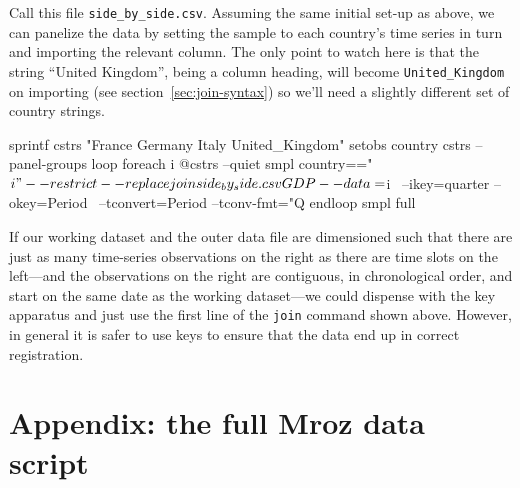 Call this file \verb|side_by_side.csv|.  Assuming the same initial
set-up as above, we can panelize the data by setting the sample to
each country's time series in turn and importing the relevant
column. The only point to watch here is that the string ``United
Kingdom'', being a column heading, will become \verb|United_Kingdom|
on importing (see section~\ref{sec:join-syntax}) so we'll need a
slightly different set of country strings.
%
\begin{code}
sprintf cstrs "France Germany Italy United_Kingdom"
setobs country cstrs --panel-groups
loop foreach i @cstrs --quiet
  smpl country=="$i" --restrict --replace
  join side_by_side.csv GDP --data=$i \
  --ikey=quarter --okey=Period \
  --tconvert=Period --tconv-fmt="Q%
endloop
smpl full
\end{code}

If our working dataset and the outer data file are dimensioned such
that there are just as many time-series observations on the right as
there are time slots on the left---and the observations on the right
are contiguous, in chronological order, and start on the same date as
the working dataset---we could dispense with the key apparatus and
just use the first line of the \texttt{join} command shown
above. However, in general it is safer to use keys to ensure that the
data end up in correct registration.


\clearpage

\section*{Appendix: the full Mroz data script}

